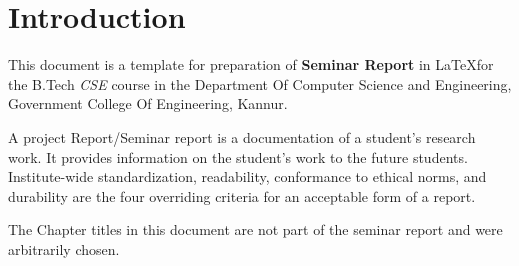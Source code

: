 \clearpage
\chapter{Introduction}
This document is a template for preparation of {\bf Seminar Report} in \LaTeX for the B.Tech
{\em CSE} course in the Department Of Computer Science and Engineering,
Government College Of Engineering,
Kannur.


A project Report/Seminar report is a documentation of a student's research
work.
It provides information on the student's work to the future students.
Institute-wide
standardization, readability, conformance to ethical norms, and durability are the four
overriding criteria for an acceptable form of a report.


The Chapter titles in this document are not part of the seminar report and were arbitrarily chosen.